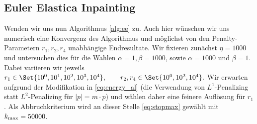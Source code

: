 \documentclass{mythesis}
\begin{document}


\subsection*{Euler Elastica Inpainting}

Wenden wir uns nun Algorithmus \ref{alg:ee} zu.
Auch hier wünschen wir uns numerisch eine Konvergenz des Algorithmus und möglichst von den Penalty-Parametern $r_1, r_2, r_4$ unabhängige Endresultate.
Wir fixieren zunächst $\eta = 1000$ und untersuchen dies für die Wahlen $\alpha = 1, \beta = 1000$, sowie $\alpha = 1000$ und $\beta = 1$.
Dabei variieren wir jeweils
\begin{math}[numbered] \label{eq:num_param}
    r_1 \in \Set{10^0, 10^1, 10^2, 10^3, 10^4}, \qquad
    r_2, r_4 \in \Set{10^0, 10^2, 10^4}.
\end{math}
Wir erwarten aufgrund der Modifikation in \eqref{eq:energy_al} (die Verwendung von $L^1$-Penalizing statt $L^2$-Penalizing für $|p| = m\cdot p$)  und wählen daher eine feinere Auflösung für $r_1$.
Als Abbruchkriterium wird an dieser Stelle \eqref{eq:stopmax} gewählt mit $k_{\mathrm{max}} = 50000$.
\end{document}
